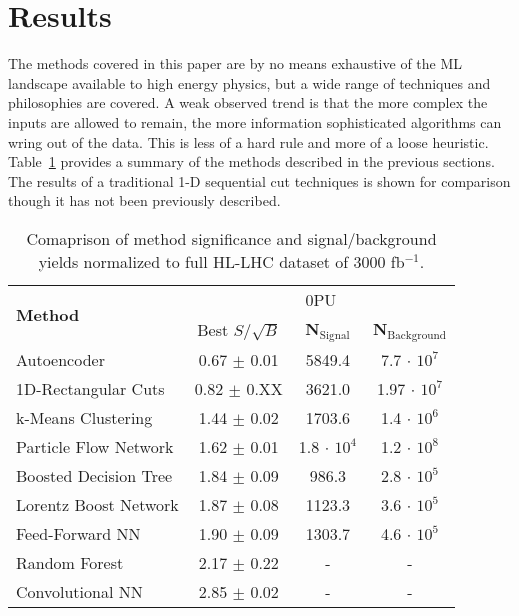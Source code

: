 \section{Results}
\label{sec:results}

The methods covered in this paper are by no means exhaustive of the ML landscape available to high energy physics, but a wide range of techniques and philosophies are covered. A weak observed trend is that the more complex the inputs are allowed to remain, the more information sophisticated algorithms can wring out of the data. This is less of a hard rule and more of a loose heuristic. Table~\ref{tab:summary} provides a summary of the methods described in the previous sections. The results of a traditional 1-D sequential cut techniques is shown for comparison though it has not been previously described. 

\begin{table}[h!]
\label{tab:summary}
  \begin{center}
  \begin{tabular}{|l|c|c|c|} %
      \hline\hline
      \multirow{2}{*}{\textbf{Method}} & \multicolumn{3}{c|}{0PU} \\
      \cline{2-4}
      & Best $S/\sqrt{B}$ & \textbf{N$_{\mathrm{Signal}}$} & \textbf{N$_{\mathrm{Background}}$} \\
      \hline
      Autoencoder           & 0.67 $\pm$ 0.01 & 5849.4 & 7.7 $\cdot$ $10^7$ \\
      1D-Rectangular Cuts   & 0.82 $\pm$ 0.XX & 3621.0 & 1.97 $\cdot$ $10^7$ \\
      k-Means Clustering    & 1.44 $\pm$ 0.02 & 1703.6 & 1.4 $\cdot$ $10^6$ \\
      Particle Flow Network & 1.62 $\pm$ 0.01 & 1.8 $\cdot$ $10^4$ & 1.2 $\cdot$ $10^8$ \\
      Boosted Decision Tree & 1.84 $\pm$ 0.09 & 986.3  & 2.8 $\cdot$ $10^5$ \\
      Lorentz Boost Network & 1.87 $\pm$ 0.08 & 1123.3 & 3.6 $\cdot$ $10^5$ \\
      Feed-Forward NN       & 1.90 $\pm$ 0.09 & 1303.7 & 4.6 $\cdot$ $10^5$ \\
      Random Forest         & 2.17 $\pm$ 0.22 & - & - \\
      Convolutional NN      & 2.85 $\pm$ 0.02 & - & - \\
      \hline\hline
    \end{tabular}
    \caption{Comaprison of method significance and signal/background yields normalized to full HL-LHC dataset of 3000 fb$^{-1}$.}
  \end{center}
\end{table}

